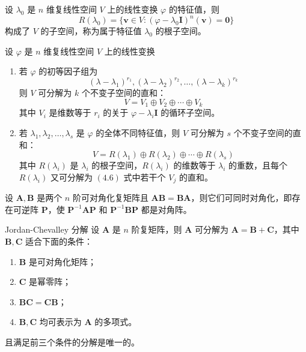 \begin{definition}
    设 $\lambda_0$ 是 $n$ 维复线性空间 $V$ 上的线性变换 $\varphi$ 的特征值，则
    \[
        R(\lambda_0) = \{\bm{v} \in V : (\varphi - \lambda_0 \bm{I})^{n}(\bm{v}) = \bm{0}\}
    \]
    构成了 $V$ 的子空间，称为属于特征值 $\lambda_0$ 的根子空间。
\end{definition}

\begin{theorem}
    设 $\varphi$ 是 $n$ 维复线性空间 $V$ 上的线性变换
    \begin{enumerate}
        \item 若 $\varphi$ 的初等因子组为
              \[
                  (\lambda - \lambda_1)^{r_1}, (\lambda - \lambda_2)^{r_2}, \ldots, (\lambda - \lambda_k)^{r_k}
              \]
              则 $V$ 可分解为 $k$ 个不变子空间的直和：
              \begin{equation}
                  V = V_1 \oplus V_2 \oplus \cdots \oplus V_k
              \end{equation}
              其中 $V_i$ 是维数等于 $r_i$ 的关于 $\varphi - \lambda_{i}\bm{I}$ 的循环子空间。
        \item 若 $\lambda_1, \lambda_2, \ldots, \lambda_s$ 是 $\varphi$ 的全体不同特征值，则 $V$ 可分解为 $s$ 个不变子空间的直和：
              \begin{equation}
                  V = R(\lambda_1) \oplus R(\lambda_2) \oplus \cdots \oplus R(\lambda_s)
              \end{equation}
              其中 $R(\lambda_i)$ 是 $\lambda_i$ 的根子空间，$R(\lambda_i)$ 的维数等于 $\lambda_i$ 的重数，且每个 $R(\lambda_i)$ 又可分解为 $(4.6)$ 式中若干个 $V_j$ 的直和。
    \end{enumerate}
\end{theorem}

\begin{lemma}
    设 $\bm{A}, \bm{B}$ 是两个 $n$ 阶可对角化复矩阵且 $\bm{AB} = \bm{BA}$，则它们可同时对角化，即存在可逆阵 $\bm{P}$，使 $\bm{P}^{-1}\bm{AP}$ 和 $\bm{P}^{-1}\bm{BP}$ 都是对角阵。
\end{lemma}

\begin{theorem}{Jordan-Chevalley 分解}
    设 $\bm{A}$ 是 $n$ 阶复矩阵，则 $\bm{A}$ 可分解为 $\bm{A} = \bm{B} + \bm{C}$，其中 $\bm{B}, \bm{C}$ 适合下面的条件：
    \begin{enumerate}
        \item $\bm{B}$ 是可对角化矩阵；
        \item $\bm{C}$ 是幂零阵；
        \item $\bm{BC} = \bm{CB}$；
        \item $\bm{B}, \bm{C}$ 均可表示为 $\bm{A}$ 的多项式。
    \end{enumerate}
    且满足前三个条件的分解是唯一的。
\end{theorem}



\section{}






